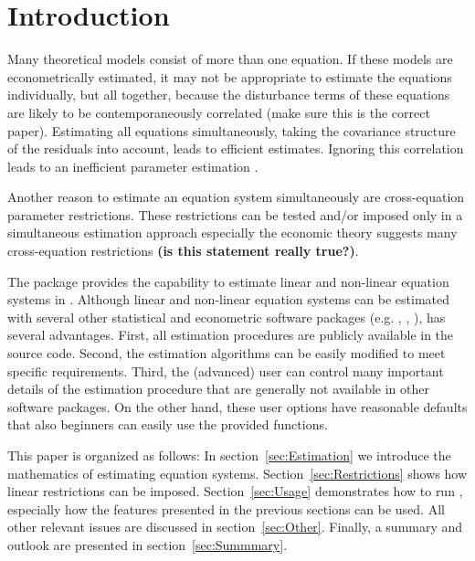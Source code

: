 


\section{Introduction}

Many theoretical models consist of more than one equation. If these
models are econometrically estimated, it may not be appropriate to
estimate the equations individually, but all together, because the
disturbance terms of these equations are likely to be
contemporaneously correlated \citep{theil71} (make sure this is the
correct paper). Estimating all equations simultaneously, taking the
covariance structure of the residuals into account, leads to efficient
estimates. Ignoring this correlation leads to an inefficient parameter
estimation \citep{zellner62}.

Another reason to estimate an equation system simultaneously are
cross-equation parameter restrictions. These restrictions can be
tested and/or imposed only in a simultaneous estimation approach
especially the economic theory suggests many cross-equation
restrictions \textbf{(is this statement really true?)}.

The  package provides the capability to estimate linear
and non-linear equation systems in .  Although linear and
non-linear equation systems can be estimated with several other
statistical and econometric software packages (e.g. ,
, ),  has several
advantages.  First, all estimation procedures are publicly available
in the source code.  Second, the estimation algorithms can be easily
modified to meet specific requirements.  Third, the (advanced) user
can control many important details of the estimation procedure that
are generally not available in other software packages.  On the other
hand, these user options have reasonable defaults that also beginners
can easily use the provided functions.

This paper is organized as follows: In section~\ref{sec:Estimation} we
introduce the mathematics of estimating equation systems.
Section~\ref{sec:Restrictions} shows how linear restrictions can be
imposed.  Section~\ref{sec:Usage} demonstrates how to run
, especially how the features presented in the previous
sections can be used. All other relevant issues are discussed in
section~\ref{sec:Other}. Finally, a summary and outlook are presented
in section~\ref{sec:Summmary}.


